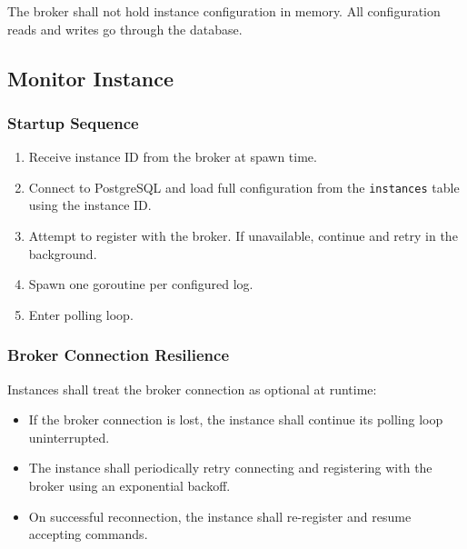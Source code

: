 \documentclass{article}
\begin{document}
The broker shall not hold instance configuration in memory. All configuration
reads and writes go through the database.

\subsection{Monitor Instance}

\subsubsection{Startup Sequence}
\begin{enumerate}
    \item Receive instance ID from the broker at spawn time.
    \item Connect to PostgreSQL and load full configuration from the
    \texttt{instances} table using the instance ID.
    \item Attempt to register with the broker. If unavailable, continue
    and retry in the background.
    \item Spawn one goroutine per configured log.
    \item Enter polling loop.
\end{enumerate}

\subsubsection{Broker Connection Resilience}
Instances shall treat the broker connection as optional at runtime:
\begin{itemize}
    \item If the broker connection is lost, the instance shall continue
    its polling loop uninterrupted.
    \item The instance shall periodically retry connecting and registering
    with the broker using an exponential backoff.
    \item On successful reconnection, the instance shall re-register and
    resume accepting commands.
\end{itemize}
\end{document}
